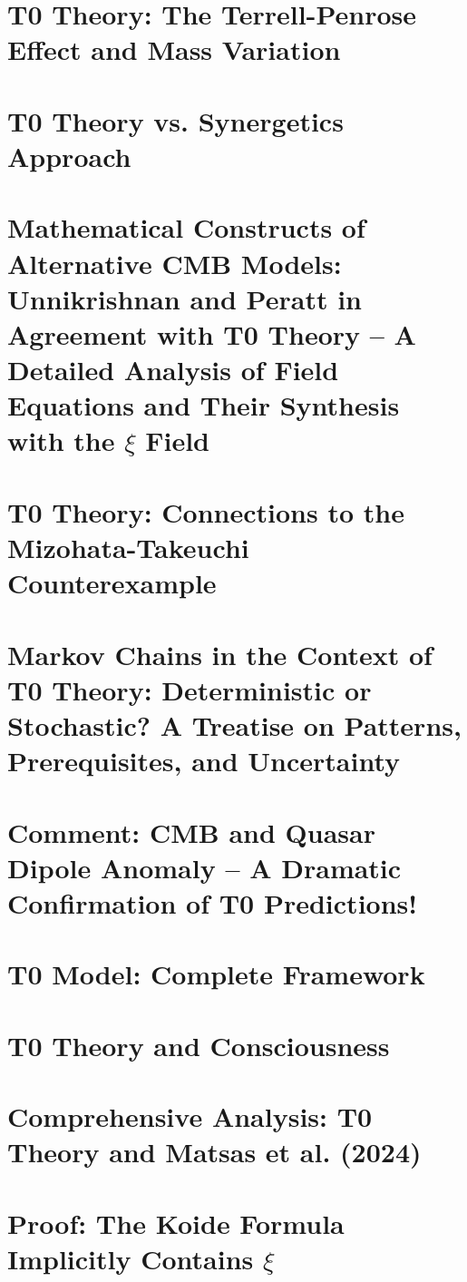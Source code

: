 	\chapter{T0 Theory: The Terrell-Penrose Effect and Mass Variation}
	
	\chapter{T0 Theory vs. Synergetics Approach}
	
	\chapter{Mathematical Constructs of Alternative CMB Models: Unnikrishnan and Peratt in Agreement with T0 Theory – A Detailed Analysis of Field Equations and Their Synthesis with the $\xi$ Field}
	
	\chapter{T0 Theory: Connections to the Mizohata-Takeuchi Counterexample}
	
	\chapter{Markov Chains in the Context of T0 Theory: Deterministic or Stochastic? A Treatise on Patterns, Prerequisites, and Uncertainty}
	
	\chapter{Comment: CMB and Quasar Dipole Anomaly – A Dramatic Confirmation of T0 Predictions!}
	
	\chapter{T0 Model: Complete Framework}
	
	\chapter{T0 Theory and Consciousness}
	
	\chapter{Comprehensive Analysis: T0 Theory and Matsas et al. (2024)}
	
	\chapter{Proof: The Koide Formula Implicitly Contains $\xi$}
	
